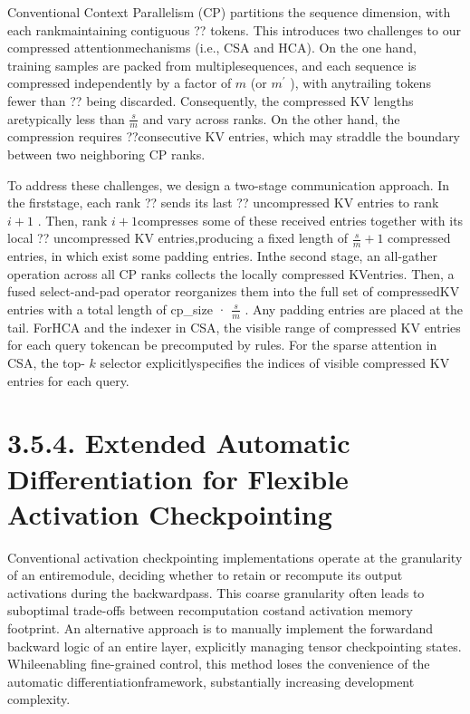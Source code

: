\documentclass[
  10
]{article}
\begin{document}
Conventional Context Parallelism (CP) partitions the sequence dimension,
with each rankmaintaining contiguous ?? tokens. This introduces two
challenges to our compressed attentionmechanisms (i.e., CSA and HCA). On
the one hand, training samples are packed from multiplesequences, and
each sequence is compressed independently by a factor of \(m\) (or
\(m ^ { \prime }\) ), with anytrailing tokens fewer than ?? being
discarded. Consequently, the compressed KV lengths aretypically less
than \(\frac { s } { m }\) and vary across ranks. On the other hand, the
compression requires ??consecutive KV entries, which may straddle the
boundary between two neighboring CP ranks.

To address these challenges, we design a two-stage communication
approach. In the firststage, each rank ?? sends its last ?? uncompressed
KV entries to rank \(i + 1\) . Then, rank \(i + 1\)compresses some of
these received entries together with its local ?? uncompressed KV
entries,producing a fixed length of
\(\textstyle { \frac { s } { m } } + 1\) compressed entries, in which
exist some padding entries. Inthe second stage, an all-gather operation
across all CP ranks collects the locally compressed KVentries. Then, a
fused select-and-pad operator reorganizes them into the full set of
compressedKV entries with a total length of cp\_size ·
\(\frac { s } { m }\) . Any padding entries are placed at the tail.
ForHCA and the indexer in CSA, the visible range of compressed KV
entries for each query tokencan be precomputed by rules. For the sparse
attention in CSA, the top- \(k\) selector explicitlyspecifies the
indices of visible compressed KV entries for each query.

\section{3.5.4. Extended Automatic Differentiation for Flexible
Activation
Checkpointing}\label{extended-automatic-differentiation-for-flexible-activation-checkpointing}

Conventional activation checkpointing implementations operate at the
granularity of an entiremodule, deciding whether to retain or recompute
its output activations during the backwardpass. This coarse granularity
often leads to suboptimal trade-offs between recomputation costand
activation memory footprint. An alternative approach is to manually
implement the forwardand backward logic of an entire layer, explicitly
managing tensor checkpointing states. Whileenabling fine-grained
control, this method loses the convenience of the automatic
differentiationframework, substantially increasing development
complexity.
\end{document}
